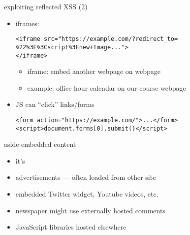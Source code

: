     \begin{frame}[fragile,label=reflectXSSExploit2]{exploiting reflected XSS (2)}
\begin{itemize}
    \item iframes:
\begin{verbatim}
<iframe src="https://example.com/?redirect_to= %22%3E%3Cscript%3Enew+Image...">
</iframe>
\end{verbatim}
        \vspace{-.5cm}
        \begin{itemize}
        \item iframe: embed another webpage on webpage
        \item example: office hour calendar on our course webpage
        \end{itemize}
    \item JS can ``click'' links/forms
        \vspace{-.5cm}
\begin{verbatim}
<form action="https://example.com/">...</form>
<script>document.forms[0].submit()</script>
\end{verbatim}
    \end{itemize}
\end{frame}

\begin{frame}{aside embedded content}
    \begin{itemize}
    \item it's 
    \item advertisements --- often loaded from other site
    \item embedded Twitter widget, Youtube videos, etc.
    \item newspaper might use externally hosted comments
    \item JavaScript libraries hosted elsewhere
    \end{itemize}
\end{frame}

